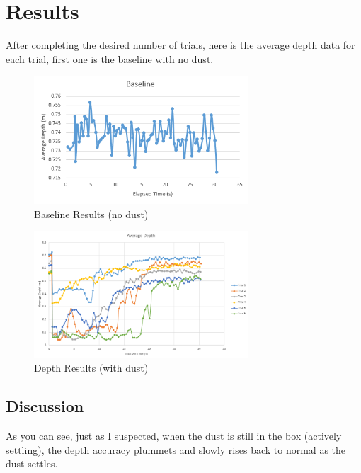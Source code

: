 \documentclass{article}
\begin{document}
	\section{Results}
		After completing the desired number of trials, here is the average depth data for each trial, first one is the baseline with no dust.
		
		\begin{figure}[h]
			\includegraphics[width=8cm]{./images/results_baseline.png}
			\centering
			\caption{Baseline Results (no dust)}
			\label{fig:baseline}
		\end{figure}
	
		\begin{figure}[h]
			\includegraphics[width=8cm]{./images/results_depth.png}
			\centering
			\caption{Depth Results (with dust)}
			\label{fig:depth}
		\end{figure}
		
		\subsection{Discussion}
			As you can see, just as I suspected, when the dust is still in the box (actively settling), the depth accuracy plummets and slowly rises back to normal as the dust settles.
	
	\newpage
	
	\listoffigures
	
\end{document}
